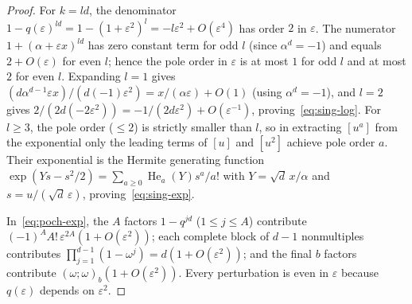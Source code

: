 \documentclass[11pt,reqno]{amsart}
\numberwithin{equation}{section}
\theoremstyle{definition}
\theoremstyle{remark}
\newcommand{\He}{\operatorname{He}}
\newcommand{\eps}{\varepsilon}
\newcommand{\poch}[3]{(#1;#2)_{#3}}
\begin{document}
\begin{proof}
For $k=ld$, the denominator $1-q(\eps)^{ld}=1-(1+\eps^2)^l=-l\eps^2+O(\eps^4)$ has order $2$ in $\eps$. The numerator $1+(\alpha+\eps x)^{ld}$ has zero constant term for odd $l$ (since $\alpha^d=-1$) and equals $2+O(\eps)$ for even $l$; hence the pole order in $\eps$ is at most $1$ for odd $l$ and at most $2$ for even $l$. Expanding $l=1$ gives $(d\alpha^{d-1}\eps x)/(d(-1)\eps^2) = x/(\alpha\eps)+O(1)$ (using $\alpha^d=-1$), and $l=2$ gives $2/(2d(-2\eps^2)) = -1/(2d\eps^2)+O(\eps^{-1})$, proving~\eqref{eq:sing-log}. For $l\ge 3$, the pole order ($\le 2$) is strictly smaller than $l$, so in extracting $[u^a]$ from the exponential only the leading terms of $[u]$ and $[u^2]$ achieve pole order $a$. Their exponential is the Hermite generating function $\exp(Ys-s^2/2)=\sum_{a\ge 0}\He_a(Y)s^a/a!$ with $Y=\sqrt{d}\,x/\alpha$ and $s=u/(\sqrt{d}\,\eps)$, proving~\eqref{eq:sing-exp}.

In~\eqref{eq:poch-exp}, the $A$ factors $1-q^{jd}$ ($1\le j\le A$) contribute $(-1)^A A!\,\eps^{2A}(1+O(\eps^2))$; each complete block of $d-1$ nonmultiples contributes $\prod_{j=1}^{d-1}(1-\omega^j)=d(1+O(\eps^2))$; and the final $b$ factors contribute $\poch{\omega}{\omega}{b}(1+O(\eps^2))$. Every perturbation is even in $\eps$ because $q(\eps)$ depends on $\eps^2$.
\end{proof}
\end{document}
